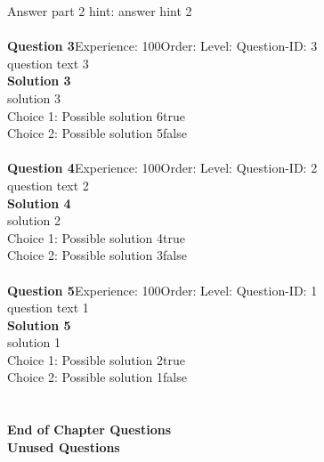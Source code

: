 \documentclass{article}
\begin{document}
Answer part 2 hint: \hspace{15pt}answer hint 2\\
\\[4pt]
\noindent\textbf{Question 3}\hspace{20pt}Experience: 100\hspace{20pt}Order: \hspace{20pt}Level: \hspace{20pt}Question-ID: 3\\[2pt]
question text 3\\[4pt]
\noindent\textbf{Solution 3}\\[2pt]
solution 3\\[4pt]
Choice 1: \hspace{20pt}Possible solution 6\hspace{20pt}true\\
Choice 2: \hspace{20pt}Possible solution 5\hspace{20pt}false\\
\\[4pt]
\noindent\textbf{Question 4}\hspace{20pt}Experience: 100\hspace{20pt}Order: \hspace{20pt}Level: \hspace{20pt}Question-ID: 2\\[2pt]
question text 2\\[4pt]
\noindent\textbf{Solution 4}\\[2pt]
solution 2\\[4pt]
Choice 1: \hspace{20pt}Possible solution 4\hspace{20pt}true\\
Choice 2: \hspace{20pt}Possible solution 3\hspace{20pt}false\\
\\[4pt]
\noindent\textbf{Question 5}\hspace{20pt}Experience: 100\hspace{20pt}Order: \hspace{20pt}Level: \hspace{20pt}Question-ID: 1\\[2pt]
question text 1\\[4pt]
\noindent\textbf{Solution 5}\\[2pt]
solution 1\\[4pt]
Choice 1: \hspace{20pt}Possible solution 2\hspace{20pt}true\\
Choice 2: \hspace{20pt}Possible solution 1\hspace{20pt}false\\
\\[4pt]
\\[2pt]
\noindent\large{\textbf{End of Chapter Questions}}\\[15pt]
\noindent\Huge{\textbf{Unused Questions}}\\[10pt]
\noindent\large{}\\
\end{document}
